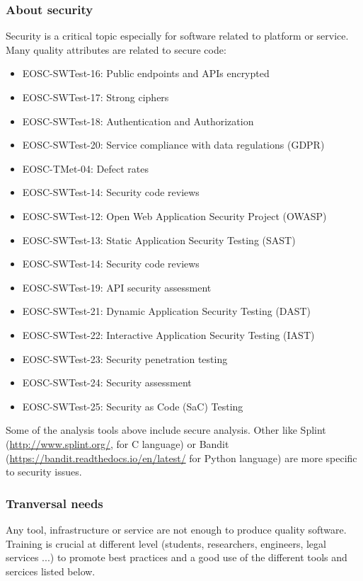 \subsubsection{About security}

Security is a critical topic especially for software related to
platform or service. Many quality attributes are related to secure code:

\begin{itemize}
  \item EOSC-SWTest-16: Public endpoints and APIs encrypted
  \item EOSC-SWTest-17: Strong ciphers
  \item EOSC-SWTest-18: Authentication and Authorization
  \item EOSC-SWTest-20: Service compliance with data regulations (GDPR)
  \item EOSC-TMet-04: Defect rates
  \item EOSC-SWTest-14: Security code reviews
  \item EOSC-SWTest-12: Open Web Application Security Project (OWASP)
  \item EOSC-SWTest-13: Static Application Security Testing (SAST)
  \item EOSC-SWTest-14: Security code reviews
  \item EOSC-SWTest-19: API security assessment
  \item EOSC-SWTest-21: Dynamic Application Security Testing (DAST)
  \item EOSC-SWTest-22: Interactive Application Security Testing (IAST)
  \item EOSC-SWTest-23: Security penetration testing
  \item EOSC-SWTest-24: Security assessment
  \item EOSC-SWTest-25: Security as Code (SaC) Testing
\end{itemize}

Some of the analysis tools above include secure analysis. Other like
Splint (\url{http://www.splint.org/}, for C language) or 
Bandit (\url{https://bandit.readthedocs.io/en/latest/} for Python
language) are more specific to security issues.

\subsubsection{Tranversal needs}

Any tool, infrastructure or service are not enough to produce quality
software. Training is crucial at different level (students,
researchers, engineers, legal services ...) to promote best practices
and a good use of the different tools and sercices listed below.


